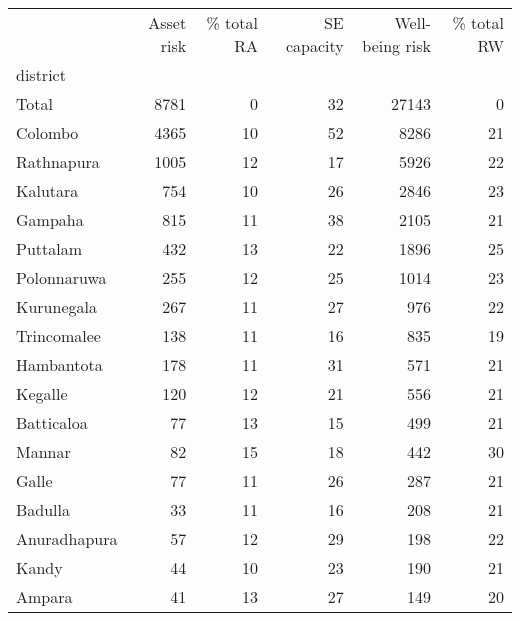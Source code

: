 \begin{tabular}{lrrrrr}
\toprule
{} &  Asset risk &  \% total RA &  SE capacity &  Well-being risk &  \% total RW \\
district     &             &             &              &                  &             \\
\midrule
Total        &        8781 &           0 &           32 &            27143 &           0 \\
Colombo      &        4365 &          10 &           52 &             8286 &          21 \\
Rathnapura   &        1005 &          12 &           17 &             5926 &          22 \\
Kalutara     &         754 &          10 &           26 &             2846 &          23 \\
Gampaha      &         815 &          11 &           38 &             2105 &          21 \\
Puttalam     &         432 &          13 &           22 &             1896 &          25 \\
Polonnaruwa  &         255 &          12 &           25 &             1014 &          23 \\
Kurunegala   &         267 &          11 &           27 &              976 &          22 \\
Trincomalee  &         138 &          11 &           16 &              835 &          19 \\
Hambantota   &         178 &          11 &           31 &              571 &          21 \\
Kegalle      &         120 &          12 &           21 &              556 &          21 \\
Batticaloa   &          77 &          13 &           15 &              499 &          21 \\
Mannar       &          82 &          15 &           18 &              442 &          30 \\
Galle        &          77 &          11 &           26 &              287 &          21 \\
Badulla      &          33 &          11 &           16 &              208 &          21 \\
Anuradhapura &          57 &          12 &           29 &              198 &          22 \\
Kandy        &          44 &          10 &           23 &              190 &          21 \\
Ampara       &          41 &          13 &           27 &              149 &          20 \\

\end{tabular}
